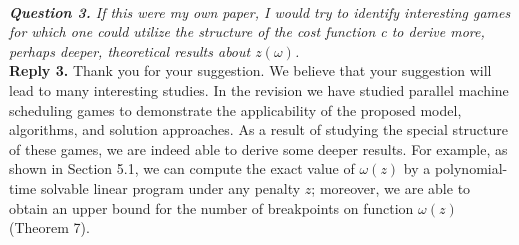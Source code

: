 \documentclass[11pt]{article}
\begin{document}
\\[4mm]
%
%
%
%
\noindent \textit{\textbf{Question 3.} 
If this were my own paper, I would try to identify interesting games for which one could utilize the structure of the cost function c to derive more, perhaps deeper, theoretical results about $z(\omega)$.}
\\[2mm]
\noindent \textbf{Reply 3.}
Thank you for your suggestion. We believe that  your suggestion will lead to many interesting studies.
In the revision we have studied parallel machine scheduling games to demonstrate the applicability of the proposed model, algorithms, and solution approaches.
As a result of studying the special structure of these games, we are indeed able to derive some deeper results.
For example, as shown in Section 5.1, we can compute the exact value of $\omega(z)$ by a polynomial-time solvable linear program under any penalty $z$; moreover, we are able to obtain an upper bound for the number of breakpoints on function $\omega(z)$ (Theorem 7).
\end{document}
